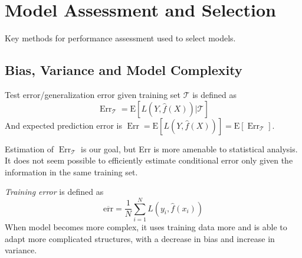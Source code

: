 \chapter{Model Assessment and Selection}
Key methods for performance assessment used to select models. 

\section{Bias, Variance and Model Complexity}
Test error/generalization error given training set $\mathcal{T}$ is defined as 
\begin{equation*}
    \operatorname{Err}_{\mathcal{T}}=\mathrm{E}[L(Y, \hat{f}(X)) | \mathcal{T}]
\end{equation*}
And expected prediction error is $\operatorname{Err}
=\mathrm{E}[L(Y, \hat{f}(X))]=\mathrm{E}\left[\operatorname{Err}_{\mathcal{T}}\right]$. 

Estimation of $\operatorname{Err}_{\mathcal{T}}$ is our goal, but Err is more amenable to statistical analysis. It does not seem possible to efficiently estimate conditional error only given the information in the same training set. 

\textit{Training error} is defined as
\begin{equation*}
    \overline{\mathrm{err}}=\frac{1}{N} \sum_{i=1}^{N} L\left(y_{i}, \hat{f}\left(x_{i}\right)\right)
\end{equation*}
When model becomes more complex, it uses training data more and is able to adapt more complicated structures, with a decrease in bias and increase in variance. 